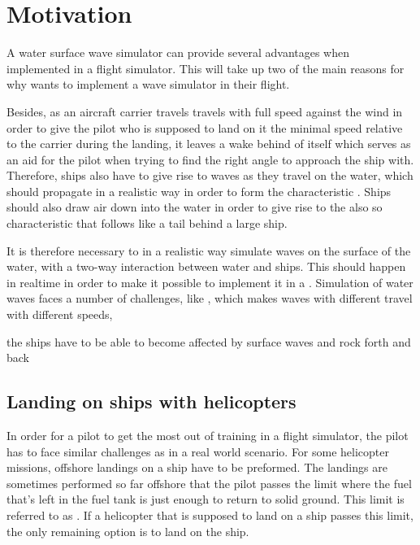 \chapter{Motivation}

A water surface wave simulator can provide several advantages when implemented in a flight simulator. This \levelname will take up two of the main reasons for why \Saab wants to implement a wave simulator in their flight.

\HRule

Besides, as an aircraft carrier travels travels with full speed against the wind in order to give the pilot who is supposed to land on it the minimal speed relative to the carrier during the landing, it leaves a wake behind of itself which serves as an aid for the pilot when trying to find the right angle to approach the ship with. Therefore, ships also have to give rise to waves as they travel on the water, which should propagate in a realistic way in order to form the characteristic . Ships should also draw air down into the water in order to give rise to the also so characteristic \backwash that follows like a tail behind a large ship.

It is therefore necessary to in a realistic way simulate waves on the surface of the water, with a two-way interaction between water and ships. This should happen in realtime in order to make it possible to implement it in a . Simulation of water waves faces a number of challenges, like , which makes waves with different \wavelengths travel with different speeds,

the ships have to be able to become affected by surface waves and rock forth and back 

\HRule

\section{Landing on ships with helicopters}

In order for a pilot to get the most out of training in a flight simulator, the pilot has to face similar challenges as in a real world scenario. For some helicopter missions, offshore landings on a ship have to be preformed. The landings are sometimes performed so far offshore that the pilot passes the limit where the fuel that's left in the fuel tank is just enough to return to solid ground. This limit is referred to as . If a helicopter that is supposed to land on a ship passes this limit, the only remaining option is to land on the ship.

